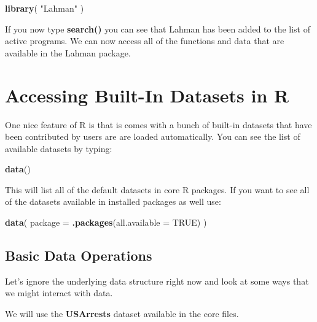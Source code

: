 \documentclass[]{book}
\newenvironment{Shaded}{\begin{snugshade}}{\end{snugshade}}
\newcommand{\DataTypeTok}[1]{\textcolor[rgb]{0.13,0.29,0.53}{#1}}
\newcommand{\KeywordTok}[1]{\textcolor[rgb]{0.13,0.29,0.53}{\textbf{#1}}}
\newcommand{\NormalTok}[1]{#1}
\newcommand{\OtherTok}[1]{\textcolor[rgb]{0.56,0.35,0.01}{#1}}
\newcommand{\StringTok}[1]{\textcolor[rgb]{0.31,0.60,0.02}{#1}}
\theoremstyle{definition}
\theoremstyle{definition}
\theoremstyle{definition}
\theoremstyle{remark}
\begin{document}
\begin{Shaded}
\begin{Highlighting}[]
\KeywordTok{library}\NormalTok{( }\StringTok{"Lahman"}\NormalTok{ )}
\end{Highlighting}
\end{Shaded}

If you now type \textbf{search()} you can see that Lahman has been added
to the list of active programs. We can now access all of the functions
and data that are available in the Lahman package.

\hypertarget{accessing-built-in-datasets-in-r}{%
\section{Accessing Built-In Datasets in
R}\label{accessing-built-in-datasets-in-r}}

One nice feature of R is that is comes with a bunch of built-in datasets
that have been contributed by users are are loaded automatically. You
can see the list of available datasets by typing:

\begin{Shaded}
\begin{Highlighting}[]
\KeywordTok{data}\NormalTok{()}
\end{Highlighting}
\end{Shaded}

This will list all of the default datasets in core R packages. If you
want to see all of the datasets available in installed packages as well
use:

\begin{Shaded}
\begin{Highlighting}[]
\KeywordTok{data}\NormalTok{( }\DataTypeTok{package =} \KeywordTok{.packages}\NormalTok{(}\DataTypeTok{all.available =} \OtherTok{TRUE}\NormalTok{) )}
\end{Highlighting}
\end{Shaded}

\hypertarget{basic-data-operations}{%
\subsection{Basic Data Operations}\label{basic-data-operations}}

Let's ignore the underlying data structure right now and look at some
ways that we might interact with data.

We will use the \textbf{USArrests} dataset available in the core files.
\end{document}
